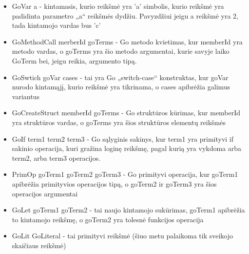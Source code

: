 \documentclass{VUMIFPSkursinis}
\begin{document}
	\begin{itemize}
		\item GoVar a - kintamasis, kurio reikšmė yra 'a' simbolis, kurio reikšmė yra padidinta parametro „a“ reikšmės dydžiu. Pavyzdžiui jeigu a reikšmė yra 2, tada kintamojo vardas bus 'c'
		\item GoMethodCall merberId goTerms - Go metodo kvietimas, kur memberId yra metodo vardas, o goTerms yra šio metodo argumentai, kurie savyje laiko GoTerm bei, jeigu reikia, argumento tipą.
		\item GoSwtich goVar cases - tai yra Go „switch-case“ konstruktas, kur goVar nurodo kintamąjį, kurio reikšmė yra tikrinama, o cases apibrėžia galimus variantus
		\item GoCreateStruct memberId goTerms - Go struktūros kūrimas, kur memberId yra struktūros vardas, o goTerms yra šios struktūros elementų reikšmės
		\item GoIf term1 term2 term3 - Go sąlyginis sakinys, kur term1 yra primityvi if sakinio operacija, kuri gražina loginę reikšmę, pagal kurią yra vykdoma arba term2, arba term3 operacijos.
		\item PrimOp goTerm1 goTerm2 goTerm3 - Go primityvi operacija, kur goTerm1 apibrėžia primityvios operacijos tipą, o goTerm2 ir goTerm3 yra šios operacijos argumentai
		\item GoLet goTerm1 goTerm2 - tai naujo kintamojo sukūrimas, goTerm1 apibrėžia to kintamojo reikšmę, o goTerm2 yra tolesnė funkcijos operacija
		\item GoLit GoLiteral - tai primityvi reikšmė (šiuo metu palaikoma tik sveikojo skaičiaus reikšmė)
	\end{itemize}
\end{document}
